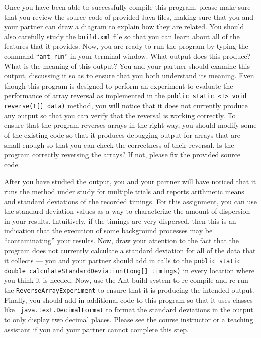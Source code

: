 \vspace*{-.1in}

Once you have been able to successfully compile this program, please make sure that you review the source code of
provided Java files, making sure that you and your partner can draw a diagram to explain how they are related. You
should also carefully study the {\tt build.xml} file so that you can learn about all of the features that it provides.
Now, you are ready to run the program by typing the command ``{\tt ant run}'' in your terminal window. What output does
this produce? What is the meaning of this output? You and your partner should examine this output, discussing it so as to
ensure that you both understand its meaning. Even though this program is designed to perform an experiment to evaluate
the performance of array reversal as implemented in the {\tt public static <T> void reverse(T[] data)} method, you will
notice that it does not currently produce any output so that you can verify that the reversal is working correctly. To
ensure that the program reverses arrays in the right way, you should modify some of the existing code so that it
produces debugging output for arrays that are small enough so that you can check the correctness of their reversal. Is
the program correctly reversing the arrays? If not, please fix the provided source code.

After you have studied the output, you and your partner will have noticed that it runs the method under study for
multiple trials and reports arithmetic means and standard deviations of the recorded timings. For this assignment, you
can use the standard deviation values as a way to characterize the amount of dispersion in your results. Intuitively, if
the timings are very dispersed, then this is an indication that the execution of some background processes may be
``contaminating'' your results. Now, draw your attention to the fact that the program does not currently calculate a
standard deviation for all of the data that it collects --- you and your partner should add in calls to the {\tt public
static double calculateStandardDeviation(Long[] timings)} in every location where you think it is needed.  Now, use the
Ant build system to re-compile and re-run the {\tt ReverseArrayExperiment} to ensure that it is producing the intended
output. Finally, you should add in additional code to this program so that it uses classes like {\tt
java.text.DecimalFormat} to format the standard deviations in the output to only display two decimal places. Please see
the course instructor or a teaching assistant if you and your partner cannot complete this step.

